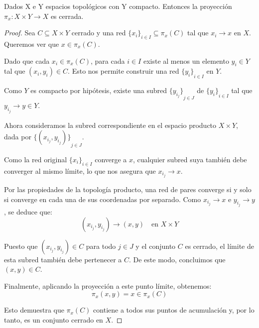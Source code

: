 \documentclass{article}
\theoremstyle{plain}
\theoremstyle{definition}
\newenvironment{ejercicio}[1]{\begin{trivlist}
\item[\hskip \labelsep {\bfseries Ejercicio}\hskip \labelsep {\bfseries #1.}]}{\end{trivlist}}
\begin{document}
\begin{ejercicio}{4}
    Dados X e Y espacios topológicos con Y compacto. Entonces la proyección \( \pi_{x}:X\times Y\rightarrow X \) es cerrada.
\end{ejercicio}
\begin{proof}
    Sea \( C \subseteq X \times Y \) cerrado y una red \( {\{x_i\}}_{i \in I} \subseteq \pi_x(C) \) tal que \( x_i \longrightarrow x \) en \( X \). Queremos ver que \( x \in \pi_x(C) \).

    Dado que cada \( x_i \in \pi_x(C) \), para cada \( i \in I \) existe al menos un elemento \( y_i \in Y \) tal que \( (x_i, y_i) \in C \).
    Esto nos permite construir una red \( {\{ y_i \}}_{i \in I} \) en \( Y \).

    Como \( Y \) es compacto por hipótesis, existe una subred \( {\{y_{i_j}\}}_{j \in J} \) de \( {\{y_i\}}_{i \in I} \) tal que \( y_{i_j} \longrightarrow y \in Y \).

    Ahora consideramos la subred correspondiente en el espacio producto \( X \times Y \), dada por \( {\{(x_{i_j}, y_{i_j})\}}_{j \in J} \).

    Como la red original \( {\{x_i\}}_{i \in I} \) converge a \( x \), cualquier subred suya también debe converger al mismo límite, lo que nos asegura que \( x_{i_j} \longrightarrow x \).

    Por las propiedades de la topología producto, una red de pares converge si y solo si converge en cada una de sus coordenadas por separado.
    Como \( x_{i_j} \longrightarrow x \) e \( y_{i_j} \longrightarrow y \), se deduce que:
    \[ (x_{i_j}, y_{i_j}) \longrightarrow (x, y) \quad \text{en } X \times Y \]

    Puesto que \( (x_{i_j}, y_{i_j}) \in C \) para todo \( j \in J \) y el conjunto \( C \) es cerrado, el límite de esta subred también debe pertenecer a \( C \).
    De este modo, concluimos que \( (x, y) \in C \).

    Finalmente, aplicando la proyección a este punto límite, obtenemos:
    \[ \pi_x(x, y) = x \in \pi_x(C) \]

    Esto demuestra que \( \pi_x(C) \) contiene a todos sus puntos de acumulación y, por lo tanto, es un conjunto cerrado en \( X \).
\end{proof}
\end{document}
